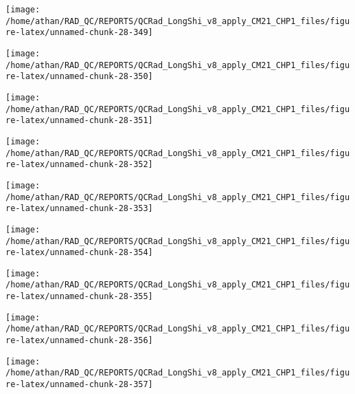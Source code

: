 \documentclass[
  10pt,
  a4paper,oneside]{article}
\begin{document}
\begin{center}\texttt{[image: /home/athan/RAD\_QC/REPORTS/QCRad\_LongShi\_v8\_apply\_CM21\_CHP1\_files/figure-latex/unnamed-chunk-28-349]} \end{center}

\begin{center}\texttt{[image: /home/athan/RAD\_QC/REPORTS/QCRad\_LongShi\_v8\_apply\_CM21\_CHP1\_files/figure-latex/unnamed-chunk-28-350]} \end{center}

\begin{center}\texttt{[image: /home/athan/RAD\_QC/REPORTS/QCRad\_LongShi\_v8\_apply\_CM21\_CHP1\_files/figure-latex/unnamed-chunk-28-351]} \end{center}

\begin{center}\texttt{[image: /home/athan/RAD\_QC/REPORTS/QCRad\_LongShi\_v8\_apply\_CM21\_CHP1\_files/figure-latex/unnamed-chunk-28-352]} \end{center}

\begin{center}\texttt{[image: /home/athan/RAD\_QC/REPORTS/QCRad\_LongShi\_v8\_apply\_CM21\_CHP1\_files/figure-latex/unnamed-chunk-28-353]} \end{center}

\begin{center}\texttt{[image: /home/athan/RAD\_QC/REPORTS/QCRad\_LongShi\_v8\_apply\_CM21\_CHP1\_files/figure-latex/unnamed-chunk-28-354]} \end{center}

\begin{center}\texttt{[image: /home/athan/RAD\_QC/REPORTS/QCRad\_LongShi\_v8\_apply\_CM21\_CHP1\_files/figure-latex/unnamed-chunk-28-355]} \end{center}

\begin{center}\texttt{[image: /home/athan/RAD\_QC/REPORTS/QCRad\_LongShi\_v8\_apply\_CM21\_CHP1\_files/figure-latex/unnamed-chunk-28-356]} \end{center}

\begin{center}\texttt{[image: /home/athan/RAD\_QC/REPORTS/QCRad\_LongShi\_v8\_apply\_CM21\_CHP1\_files/figure-latex/unnamed-chunk-28-357]} \end{center}
\end{document}
